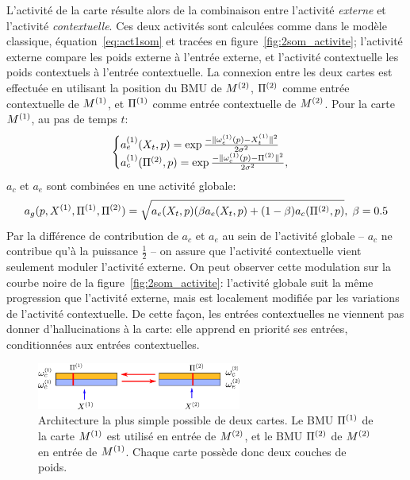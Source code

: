 L'activité de la carte résulte alors de la combinaison entre l'activité \emph{externe} et l'activité \emph{contextuelle}. Ces deux activités sont calculées comme dans le modèle classique, équation~\ref{eq:act1som} et tracées en figure~\ref{fig:2som_activite}; l'activité externe compare les poids externe à l'entrée externe, et l'activité contextuelle les poids contextuels à l'entrée contextuelle. 
La connexion entre les deux cartes est effectuée en utilisant la position du BMU de $M^{({2})}$, $\Pi^{({2})}$ comme entrée contextuelle de $M^{({1})}$, et $\Pi^{({1})}$ comme entrée contextuelle de $M^{({2})}$. 
Pour la carte $M^{({1})}$, au pas de temps $t$:
\begin{equation}
\label{eq:activite}
\begin{cases}
a_e^{({1})}(X_t,p) = \exp\frac{-\lVert \omega_e^{({1})}(p)-X^{({1})}_t \rVert^2}{2\sigma^2} \\
a_c^{({1})}(\Pi^{({2})},p) = \exp\frac{-\lVert \omega_c^{({1})}(p)-\Pi^{({2})} \rVert ^2}{2\sigma^2}, \\
\end{cases}
\end{equation}
$a_c$ et $a_e$ sont combinées en une activité globale:
\begin{equation}
a_g(p,X^{({1})},\Pi^{({1})},\Pi^{({2})}) = \sqrt{a_e(X_t,p)(\beta a_e(X_t,p) + (1-\beta) a_c(\Pi^{({2})},p)}, \; \beta=0.5
\end{equation}
Par la différence de contribution de $a_c$ et $a_e$ au sein de l'activité globale -- $a_c$ ne contribue qu'à la puissance $\frac{1}{2}$ -- on assure que l'activité contextuelle vient seulement moduler l'activité externe. On peut observer cette modulation sur la courbe noire de la figure~\ref{fig:2som_activite}: l'activité globale suit la même progression que l'activité externe, mais est localement modifiée par les variations de l'activité contextuelle. De cette façon, les entrées contextuelles ne viennent pas donner d'hallucinations à la carte: elle apprend en priorité ses entrées, conditionnées aux entrées contextuelles.
\begin{figure}
\centering
\includegraphics[width=0.6\textwidth]{archi_2som}
\caption{Architecture la plus simple possible de deux cartes. Le BMU $\Pi^{({1})}$ de la carte $M^{({1})}$ est utilisé en entrée de $M^{({2})}$, et le BMU $\Pi^{({2})}$ de $M^{({2})}$ en entrée de $M^{({1})}$. Chaque carte possède donc deux couches de poids. \label{fig:2som_archi}}
\end{figure}
